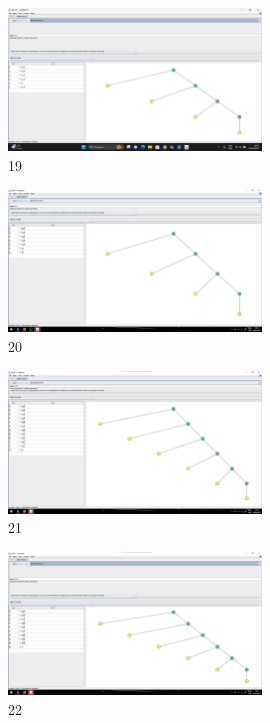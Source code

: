\documentclass[a4paper,12pt]{article}
\begin{document}
    \begin{figure}[H]
        \centering
        \includegraphics[width=0.6\textwidth]{Aula03/Daniel/19.png}
        \caption*{19}
    \end{figure}
    \begin{figure}[H]
        \centering
        \includegraphics[width=0.6\textwidth]{Aula03/Abigail/20.png}
        \caption*{20}
    \end{figure}
    \begin{figure}[H]
        \centering
        \includegraphics[width=0.6\textwidth]{Aula03/Abigail/21.png}
        \caption*{21}
    \end{figure}
    \begin{figure}[H]
        \centering
        \includegraphics[width=0.6\textwidth]{Aula03/Abigail/22.png}
        \caption*{22}
    \end{figure}
\end{document}
